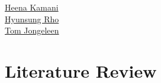 

\begin{center}
{\small
\href{mailto:Hkamani@ualberta.ca}{Heena Kamani} \\
\href{mailto:hrho@ualberta.ca}{Hyunsung Rho} \\
\href{mailto:tjongele@ualberta.ca}{Tom Jongeleen}
}
\end{center}

\section{Literature Review}


